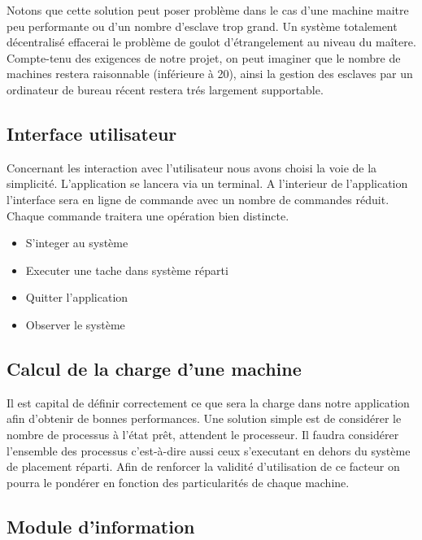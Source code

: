     Notons que cette solution peut poser problème dans le cas d'une
    machine maitre peu performante ou d'un nombre d'esclave trop
    grand. Un système totalement décentralisé effacerai le problème de
    goulot d'étrangelement au niveau du maîtere. Compte-tenu des
    exigences de notre projet, on peut imaginer que le nombre de
    machines restera raisonnable (inférieure à 20), ainsi la gestion
    des esclaves par un ordinateur de bureau récent restera trés
    largement supportable.
        
  \subsection{Interface utilisateur}

    Concernant les interaction avec l'utilisateur nous avons choisi la
    voie de la simplicité. L'application se lancera via un terminal.
    A l'interieur de l'application l'interface sera en ligne de
    commande avec un nombre de commandes réduit. Chaque commande
    traitera une opération bien distincte.

    \begin{itemize}
      \item S'integer au système
      \item Executer une tache dans système réparti
      \item Quitter l'application
      \item Observer le système
    \end{itemize}
        
  \subsection{Calcul de la charge d'une machine}

    Il est capital de définir correctement ce que sera la charge dans
    notre application afin d'obtenir de bonnes performances. Une
    solution simple est de considérer le nombre de processus à l'état
    prêt, attendent le processeur. Il faudra considérer l'ensemble des
    processus c'est-à-dire aussi ceux s'executant en dehors du système
    de placement réparti. Afin de renforcer la validité d'utilisation
    de ce facteur on pourra le pondérer en fonction des particularités
    de chaque machine.
      
    \subsection{Module d'information}

